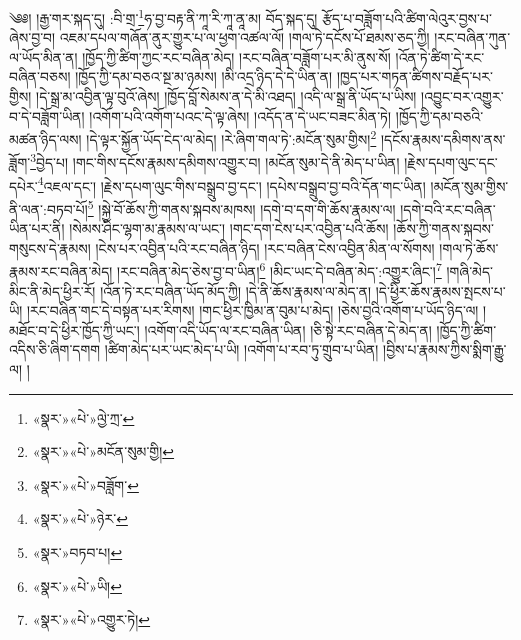  ༄༅། །རྒྱ་གར་སྐད་དུ། :བི་གྲ་\footnote{«སྣར་»«པེ་»ལྱེ་ཀྲ་}ཧ་བྱ་བརྟ་ནི་ཀཱ་རི་ཀཱ་ནཱ་མ། བོད་སྐད་དུ། རྩོད་པ་བཟློག་པའི་ཚིག་ལེའུར་བྱས་པ་ཞེས་བྱ་བ། འཇམ་དཔལ་གཞོན་ནུར་གྱུར་པ་ལ་ཕྱག་འཚལ་ལོ། །གལ་ཏེ་དངོས་པོ་ཐམས་ཅད་ཀྱི། །རང་བཞིན་ཀུན་ལ་ཡོད་མིན་ན། །ཁྱོད་ཀྱི་ཚིག་ཀྱང་རང་བཞིན་མེད། །རང་བཞིན་བཟློག་པར་མི་ནུས་སོ། །འོན་ཏེ་ཚིག་དེ་རང་བཞིན་བཅས། །ཁྱོད་ཀྱི་དམ་བཅའ་སྔ་མ་ཉམས། །མི་འདྲ་ཉིད་དེ་དེ་ཡིན་ན། །ཁྱད་པར་གཏན་ཚིགས་བརྗོད་པར་གྱིས། །དེ་སྒྲ་མ་འབྱིན་ལྟ་བུའོ་ཞེས། །ཁྱོད་བློ་སེམས་ན་དེ་མི་འཐད། །འདི་ལ་སྒྲ་ནི་ཡོད་པ་ཡིས། །འབྱུང་བར་འགྱུར་བ་དེ་བཟློག་ཡིན། །འགོག་པའི་འགོག་པའང་དེ་ལྟ་ཞེས། །འདོད་ན་དེ་ཡང་བཟང་མིན་ཏེ། །ཁྱོད་ཀྱི་དམ་བཅའི་མཚན་ཉིད་ལས། །དེ་ལྟར་སྐྱོན་ཡོད་ངེད་ལ་མེད། །རེ་ཞིག་གལ་ཏེ་:མངོན་སུམ་གྱིས།\footnote{«སྣར་»«པེ་»མངོན་སུམ་གྱི།} །དངོས་རྣམས་དམིགས་ནས་ཟློག་\footnote{«སྣར་»«པེ་»བཟློག་}བྱེད་པ། །གང་གིས་དངོས་རྣམས་དམིགས་འགྱུར་བ། །མངོན་སུམ་དེ་ནི་མེད་པ་ཡིན། །རྗེས་དཔག་ལུང་དང་དཔེར་\footnote{«སྣར་»«པེ་»ཉེར་}འཇལ་དང་། །རྗེས་དཔག་ལུང་གིས་བསྒྲུབ་བྱ་དང་། །དཔེས་བསྒྲུབ་བྱ་བའི་དོན་གང་ཡིན། །མངོན་སུམ་གྱིས་ནི་ལན་:བཏབ་པོ།\footnote{«སྣར་»བཏབ་པ།} །སྐྱེ་བོ་ཆོས་ཀྱི་གནས་སྐབས་མཁས། །དགེ་བ་དག་གི་ཆོས་རྣམས་ལ། །དགེ་བའི་རང་བཞིན་ཡིན་པར་ནི། །སེམས་ཤིང་ལྷག་མ་རྣམས་ལ་ཡང་། །གང་དག་ངེས་པར་འབྱིན་པའི་ཆོས། །ཆོས་ཀྱི་གནས་སྐབས་གསུངས་དེ་རྣམས། །ངེས་པར་འབྱིན་པའི་རང་བཞིན་ཉིད། །རང་བཞིན་ངེས་འབྱིན་མིན་ལ་སོགས། །གལ་ཏེ་ཆོས་རྣམས་རང་བཞིན་མེད། །རང་བཞིན་མེད་ཅེས་བྱ་བ་ཡིན།\footnote{«སྣར་»«པེ་»ཡི།} །མིང་ཡང་དེ་བཞིན་མེད་:འགྱུར་ཞིང་།\footnote{«སྣར་»«པེ་»འགྱུར་ཏེ།} །གཞི་མེད་མིང་ནི་མེད་ཕྱིར་རོ། །འོན་ཏེ་རང་བཞིན་ཡོད་མོད་ཀྱི། །དེ་ནི་ཆོས་རྣམས་ལ་མེད་ན། །དེ་ཕྱིར་ཆོས་རྣམས་སྤངས་པ་ཡི། །རང་བཞིན་གང་དེ་བསྟན་པར་རིགས། །གང་ཕྱིར་ཁྱིམ་ན་བུམ་པ་མེད། །ཅེས་བྱའི་འགོག་པ་ཡོད་ཉིད་ལ། །མཐོང་བ་དེ་ཕྱིར་ཁྱོད་ཀྱི་ཡང་། །འགོག་འདི་ཡོད་ལ་རང་བཞིན་ཡིན། །ཅི་སྟེ་རང་བཞིན་དེ་མེད་ན། །ཁྱོད་ཀྱི་ཚིག་འདིས་ཅི་ཞིག་དགག །ཚིག་མེད་པར་ཡང་མེད་པ་ཡི། །འགོག་པ་རབ་ཏུ་གྲུབ་པ་ཡིན། །བྱིས་པ་རྣམས་ཀྱིས་སྨིག་རྒྱུ་ལ། །
